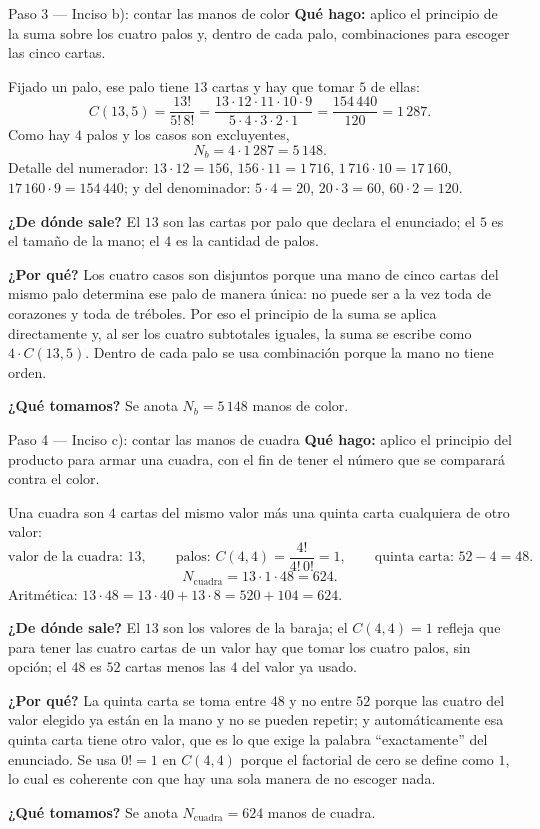 \documentclass[11pt]{article}
\begin{document}
\begin{paso}{Paso 3 --- Inciso b): contar las manos de color}
\textbf{Qué hago:} aplico el principio de la suma sobre los cuatro palos y, dentro de cada palo, combinaciones para escoger las cinco cartas.

Fijado un palo, ese palo tiene $13$ cartas y hay que tomar $5$ de ellas:
\[
  C(13,5)=\frac{13!}{5!\,8!}=\frac{13\cdot 12\cdot 11\cdot 10\cdot 9}{5\cdot 4\cdot 3\cdot 2\cdot 1}=\frac{154\,440}{120}=1\,287 .
\]
Como hay $4$ palos y los casos son excluyentes,
\[
  N_b = 4\cdot 1\,287 = 5\,148 .
\]
Detalle del numerador: $13\cdot 12=156$, $156\cdot 11=1\,716$, $1\,716\cdot 10=17\,160$, $17\,160\cdot 9=154\,440$; y del denominador: $5\cdot 4=20$, $20\cdot 3=60$, $60\cdot 2=120$.

\textbf{¿De dónde sale?} El $13$ son las cartas por palo que declara el enunciado; el $5$ es el tamaño de la mano; el $4$ es la cantidad de palos.

\textbf{¿Por qué?} Los cuatro casos son disjuntos porque una mano de cinco cartas del mismo palo determina ese palo de manera única: no puede ser a la vez toda de corazones y toda de tréboles. Por eso el principio de la suma se aplica directamente y, al ser los cuatro subtotales iguales, la suma se escribe como $4\cdot C(13,5)$. Dentro de cada palo se usa combinación porque la mano no tiene orden.

\textbf{¿Qué tomamos?} Se anota $N_b=5\,148$ manos de color.
\end{paso}

\begin{paso}{Paso 4 --- Inciso c): contar las manos de cuadra}
\textbf{Qué hago:} aplico el principio del producto para armar una cuadra, con el fin de tener el número que se comparará contra el color.

Una cuadra son $4$ cartas del mismo valor más una quinta carta cualquiera de otro valor:
\[
  \text{valor de la cuadra: } 13,\qquad
  \text{palos: } C(4,4)=\frac{4!}{4!\,0!}=1,\qquad
  \text{quinta carta: } 52-4=48 .
\]
\[
  N_{\text{cuadra}} = 13\cdot 1\cdot 48 = 624 .
\]
Aritmética: $13\cdot 48 = 13\cdot 40 + 13\cdot 8 = 520+104=624$.

\textbf{¿De dónde sale?} El $13$ son los valores de la baraja; el $C(4,4)=1$ refleja que para tener las cuatro cartas de un valor hay que tomar los cuatro palos, sin opción; el $48$ es $52$ cartas menos las $4$ del valor ya usado.

\textbf{¿Por qué?} La quinta carta se toma entre $48$ y no entre $52$ porque las cuatro del valor elegido ya están en la mano y no se pueden repetir; y automáticamente esa quinta carta tiene otro valor, que es lo que exige la palabra ``exactamente'' del enunciado. Se usa $0!=1$ en $C(4,4)$ porque el factorial de cero se define como $1$, lo cual es coherente con que hay una sola manera de no escoger nada.

\textbf{¿Qué tomamos?} Se anota $N_{\text{cuadra}}=624$ manos de cuadra.
\end{paso}
\end{document}
